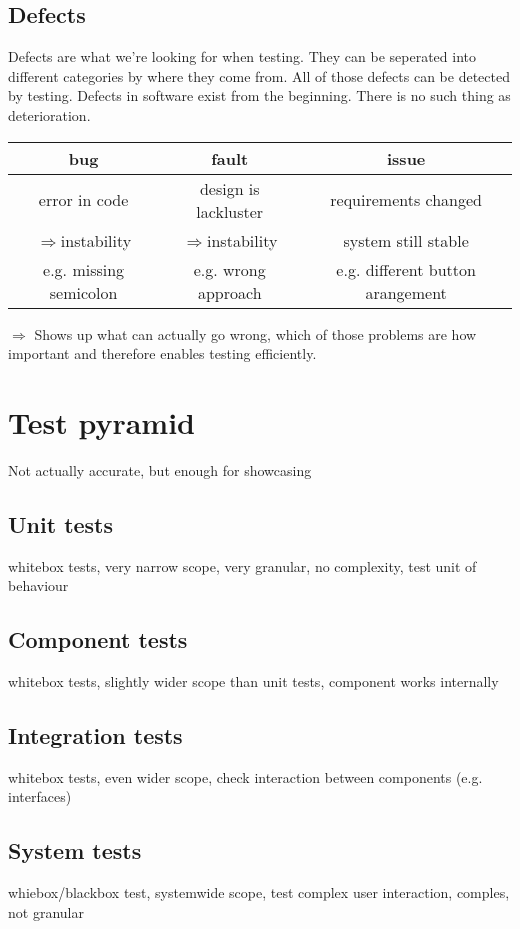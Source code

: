 \documentclass[a4paper]{scrbook}
\begin{document}
        \subsection{Defects}
        Defects are what we're looking for when testing. They can be seperated into different categories by where they come from. All of those defects can be detected by testing. Defects in software exist from the beginning. There is no such thing as deterioration.
        \begin{tabular}{c|c|c}
            bug             &   fault                   &   issue   \\
            \hline
            error in code   &   design is lackluster    &   requirements changed    \\
            $\Rightarrow$instability   &   $\Rightarrow$instability           &   system still stable \\
            e.g. missing semicolon  &   e.g. wrong approach &   e.g. different button arangement
        \end{tabular}
         \newline \newline
        $\Rightarrow$ Shows up what can actually go wrong, which of those problems are how important and therefore enables testing efficiently.
    \section{Test pyramid}
    Not actually accurate, but enough for showcasing
        \subsection{Unit tests}
        whitebox tests, very narrow scope, very granular, no complexity, test unit of behaviour
        \subsection{Component tests}
        whitebox tests, slightly wider scope than unit tests, component works internally
        \subsection{Integration tests}
        whitebox tests, even wider scope, check interaction between components (e.g. interfaces)
        \subsection{System tests}
        whiebox/blackbox test, systemwide scope, test complex user interaction, comples, not granular
\end{document}

